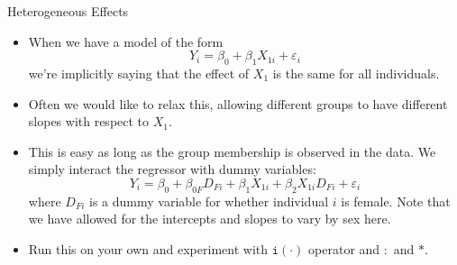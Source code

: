 \begin{frame}{Heterogeneous Effects}
	\small
\begin{itemize}
	\item When we have a model of the form \[
		Y_i = \beta_0 + \beta_1 X_{1i} + \varepsilon_i
	\]
	we're implicitly saying that the effect of $X_1$ is the same for all individuals.
	
	\smallskip
	\item Often we would like to relax this, allowing different 
	groups to have different slopes with respect to $X_{1}$.
	
	\smallskip
	\item This is easy as long as the group membership is observed in the data.
	We simply interact the regressor with dummy variables:\[
Y_{i}=\beta_{0}+\beta_{0F}D_{Fi}+\beta_{1}X_{1i}+\beta_{2}X_{1i}D_{Fi}+\varepsilon_{i}
\]
	where $D_{Fi}$ is a dummy variable for whether individual $i$ is female. Note that
	we have allowed for the intercepts and slopes to vary by sex here. 
\item Run this on your own and experiment with $\texttt{i}(\cdot)$ operator and $:$ and $*$.
\end{itemize}
\end{frame}



